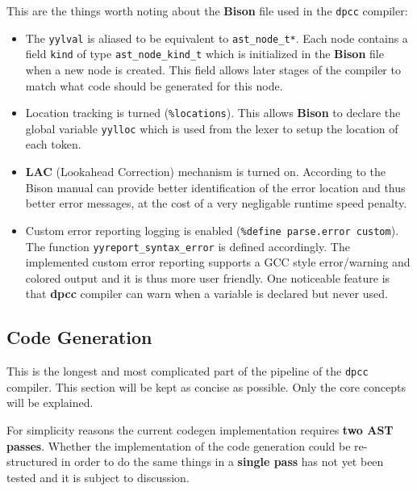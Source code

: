 \documentclass[a4paper]{article}
\begin{document}
This are the things worth noting about the \textbf{Bison} file used in the \texttt{dpcc} compiler:

\begin{itemize}
\item The \texttt{yylval} is aliased to be equivalent to \texttt{ast\_node\_t*}. Each node contains a field \texttt{kind} of type \texttt{ast\_node\_kind\_t}
  which is initialized in the \textbf{Bison} file when a new node is created. This field allows later
  stages of the compiler to match what code should be generated for this node.
\item Location tracking is turned (\texttt{\%locations}). This allows \textbf{Bison} to declare the global variable \texttt{yylloc}
  which is used from the lexer to setup the location of each token.
\item \textbf{LAC} (Lookahead Correction) mechanism is turned on. According to the Bison manual can provide
  better identification of the error location and thus better error messages, at the cost of a very negligable runtime speed penalty.
\item Custom error reporting logging is enabled (\texttt{\%define parse.error custom}). The function
  \texttt{yyreport\_syntax\_error}
  is defined accordingly. The implemented custom error reporting
  supports a GCC style error/warning and colored output and it is thus more user friendly. One noticeable feature is that \textbf{dpcc} compiler can warn when a variable is declared but never used.
\end{itemize}



\subsection{Code Generation}

This is the longest and most complicated part of the pipeline of the \texttt{dpcc} compiler.
This section will be kept as concise as possible. Only the core concepts will be explained.

For simplicity reasons the current codegen implementation requires \textbf{two AST passes}. Whether
the implementation of the code generation could be re-structured in order to do the same things
in a \textbf{single pass} has not yet been tested and it is subject to discussion.
\end{document}

